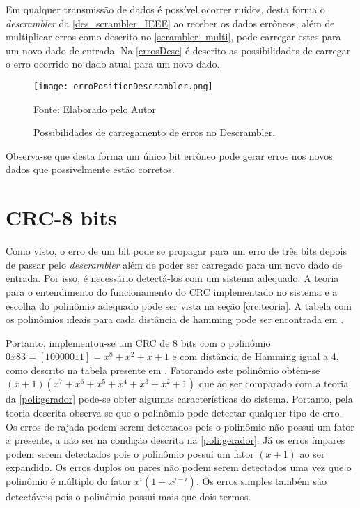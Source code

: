 Em qualquer transmissão de dados é possível ocorrer ruídos, desta forma o \textit{descrambler} da \autoref{des_scrambler_IEEE} ao receber os dados errôneos, além de multiplicar erros como descrito no \autoref{scrambler_multi}, pode carregar estes para um novo dado de entrada. Na \autoref{errosDesc} é descrito as possibilidades de carregar o erro ocorrido no dado atual para um novo dado.

\begin{figure}[H]
	\caption{\label{errosDesc} Possibilidades de carregamento de erros no Descrambler.}
	\centering
	\texttt{[image: erroPositionDescrambler.png]}
	\begin{center}
		Fonte: Elaborado pelo Autor
	\end{center}	
\end{figure}

Observa-se que desta forma um único bit errôneo pode gerar erros nos novos dados que possivelmente estão corretos.

\section{CRC-8 bits} \label{crc8}

Como visto, o erro de um bit pode se propagar para um erro de três bits depois de passar pelo \textit{descrambler} além de poder ser carregado para um novo dado de entrada. Por isso, é necessário detectá-los com um sistema adequado. A teoria para o entendimento do funcionamento do CRC implementado no sistema e a escolha do polinômio adequado pode ser vista na seção \autoref{crc:teoria}. A tabela com os polinômios ideais para cada distância de hamming pode ser encontrada em \cite{Philip2018}.  

Portanto, implementou-se um CRC de 8 bits com o polinômio $0x83= [1 0 0 0 0 0 1 1] = x^{8} + x^{2} + x + 1$ e com distância de Hamming igual a 4, como descrito na tabela presente em \cite{CRCTable2018}. Fatorando este polinômio obtêm-se $(x + 1)(x^{7} + x^{6} + x^{5} + x^{4} + x^{3} + x^{2} + 1)$ que ao ser comparado com a teoria da \autoref{poli:gerador} pode-se obter algumas características do sistema. Portanto, pela teoria descrita observa-se que o polinômio pode detectar qualquer tipo de erro. Os erros de rajada podem serem detectados pois o polinômio não possui um fator $x$ presente, a não ser na condição descrita na \autoref{poli:gerador}. Já os erros ímpares podem serem detectados pois o polinômio possui um fator $(x + 1)$ ao ser expandido. Os erros duplos ou pares não podem serem detectados uma vez que o polinômio é múltiplo do fator $x^{i}(1 + x^{j − i})$. Os erros simples também são detectáveis pois o polinômio possui mais que dois termos.

